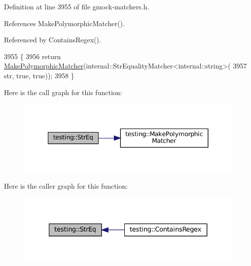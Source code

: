Definition at line 3955 of file gmock-\/matchers.\+h.



References Make\+Polymorphic\+Matcher().



Referenced by Contains\+Regex().


\begin{DoxyCode}
3955                                      \{
3956   \textcolor{keywordflow}{return} \hyperlink{namespacetesting_a667ca94f190ec2e17ee2fbfdb7d3da04}{MakePolymorphicMatcher}(internal::StrEqualityMatcher<internal::string>(
3957       str, \textcolor{keyword}{true}, \textcolor{keyword}{true}));
3958 \}
\end{DoxyCode}
Here is the call graph for this function\+:
\nopagebreak
\begin{figure}[H]
\begin{center}
\leavevmode
\includegraphics[width=341pt]{namespacetesting_a154de81376ae7d584c6e5a619b45fb09_cgraph}
\end{center}
\end{figure}
Here is the caller graph for this function\+:
\nopagebreak
\begin{figure}[H]
\begin{center}
\leavevmode
\includegraphics[width=327pt]{namespacetesting_a154de81376ae7d584c6e5a619b45fb09_icgraph}
\end{center}
\end{figure}
\mbox{\label{namespacetesting_a6f6b8af3d19cb969df0eb995c47a14d2}} 
